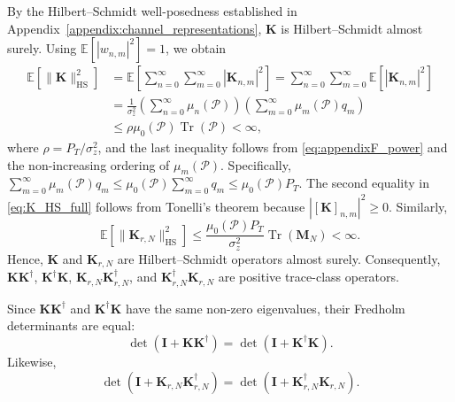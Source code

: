 \documentclass[lettersize,journal]{IEEEtran}
\theoremstyle{plain}
\begin{document}
By the Hilbert--Schmidt well-posedness established in
Appendix~\ref{appendix:channel_representations}, $\mathbf K$ is Hilbert--Schmidt almost surely.
Using $\mathbb E[|w_{n,m}|^2]=1$, we obtain
\begin{align}
	\mathbb{E}
	\left[
	\|\mathbf{K}\|_{\mathrm{HS}}^2
	\right] &= \mathbb{E}\left[\sum_{n=0}^{\infty}\sum_{m=0}^{\infty}\left|\mathbf{K}_{n,m}\right|^2\right] =\sum_{n=0}^{\infty}\sum_{m=0}^{\infty}\mathbb{E}\left[\left|\mathbf{K}_{n,m}\right|^2\right] \nonumber \\
	&=
	\frac{1}{\sigma_z^2}
	\left(
	\sum_{n=0}^{\infty}\mu_n(\mathcal{P})
	\right)
	\left(
	\sum_{m=0}^{\infty}
	\mu_m(\mathcal{P})q_m
	\right)
	\nonumber\\
	&\leq
	\rho\mu_0(\mathcal{P})
	\operatorname{Tr}(\mathcal{P})
	<\infty,
	\label{eq:K_HS_full}
\end{align}
where $\rho=P_T/\sigma_z^2$, and the last inequality follows
from \eqref{eq:appendixF_power} and the non-increasing ordering
of $\mu_m(\mathcal P)$. Specifically, $\sum_{m=0}^{\infty}
	\mu_m(\mathcal P)q_m
	\leq
	\mu_0(\mathcal P)
	\sum_{m=0}^{\infty}q_m
	\leq
	\mu_0(\mathcal P)P_T$.
The second equality in \eqref{eq:K_HS_full} follows from
Tonelli's theorem because
$|[\mathbf K]_{n,m}|^2\geq0$.
Similarly,
$$
	\mathbb E
	\left[
	\|\mathbf K_{r,N}\|_{\mathrm{HS}}^2
	\right]
	\leq
	\frac{\mu_0(\mathcal P)P_T}{\sigma_z^2}
	\operatorname{Tr}(\mathbf M_N)
	<\infty.
	\label{eq:KrN_HS_bound}
$$
Hence, $\mathbf K$ and $\mathbf K_{r,N}$ are Hilbert--Schmidt
operators almost surely. 
Consequently,
$\mathbf K\mathbf K^\dagger$,
$\mathbf K^\dagger\mathbf K$,
$\mathbf K_{r,N}\mathbf K_{r,N}^\dagger$, and
$\mathbf K_{r,N}^\dagger\mathbf K_{r,N}$
are positive trace-class operators.

Since $\mathbf K\mathbf K^\dagger$ and
$\mathbf K^\dagger\mathbf K$ have the same non-zero
eigenvalues, their Fredholm determinants are equal:
\begin{equation}
	\det
	\left(
	\mathbf I+\mathbf K\mathbf K^\dagger
	\right)
	=
	\det
	\left(
	\mathbf I+\mathbf K^\dagger\mathbf K
	\right).
	\label{eq:K_fredholm_identity}
\end{equation}
Likewise,
\begin{equation}
	\det
	\left(
	\mathbf I+\mathbf K_{r,N}\mathbf K_{r,N}^\dagger
	\right)
	=
	\det
	\left(
	\mathbf I+\mathbf K_{r,N}^\dagger\mathbf K_{r,N}
	\right).
	\label{eq:KrN_fredholm_identity}
\end{equation}
\end{document}
